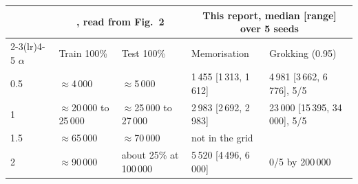 \begin{tabular}{lllll}
\toprule
& \multicolumn{2}{c}{\citet{kumarGrokkingTransitionLazy2024}, read from Fig.~2} & \multicolumn{2}{c}{This report, median [range] over 5 seeds} \\
\cmidrule(lr){2-3}\cmidrule(lr){4-5}
$\alpha$ & Train 100\% & Test 100\% & Memorisation & Grokking (0.95) \\
\midrule
0.5 & $\approx$4\,000 & $\approx$5\,000 & 1\,455 [1\,313, 1\,612] & 4\,981 [3\,662, 6\,776], 5/5 \\
1 & $\approx$20\,000 to 25\,000 & $\approx$25\,000 to 27\,000 & 2\,983 [2\,692, 2\,983] & 23\,000 [15\,395, 34\,000], 5/5 \\
1.5 & $\approx$65\,000 & $\approx$70\,000 & not in the grid &  \\
2 & $\approx$90\,000 & about 25\% at 100\,000 & 5\,520 [4\,496, 6\,000] & 0/5 by 200\,000 \\
\bottomrule
\end{tabular}
